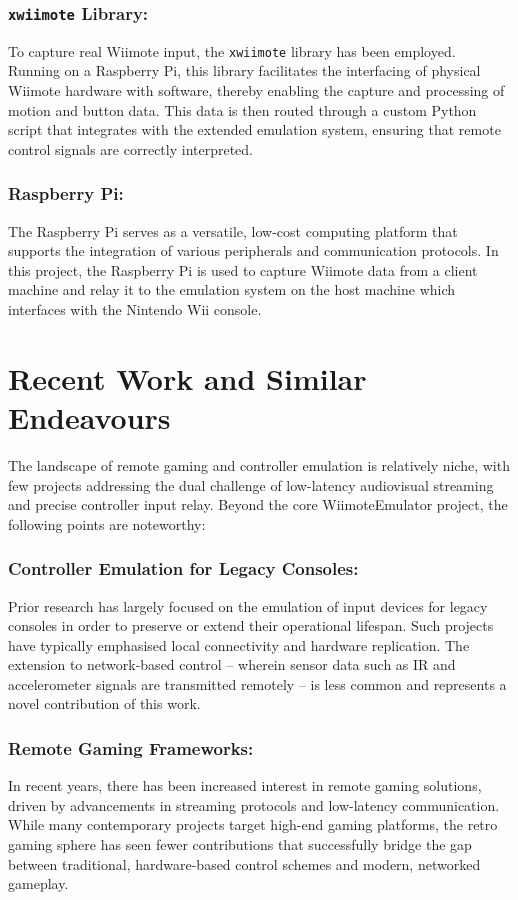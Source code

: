 \subsubsection{\texttt{xwiimote} Library\cite{xwiimote}:} To capture real Wiimote input, the \texttt{xwiimote} library has been employed. Running on a Raspberry Pi, this library facilitates the interfacing of physical Wiimote hardware with software, thereby enabling the capture and processing of motion and button data. This data is then routed through a custom Python script that integrates with the extended emulation system, ensuring that remote control signals are correctly interpreted.

\subsubsection{Raspberry Pi:} The Raspberry Pi serves as a versatile, low-cost computing platform that supports the integration of various peripherals and communication protocols. In this project, the Raspberry Pi is used to capture Wiimote data from a client machine and relay it to the emulation system on the host machine which interfaces with the Nintendo Wii console.


\section{Recent Work and Similar Endeavours}

The landscape of remote gaming and controller emulation is relatively niche, with few projects addressing the dual challenge of low-latency audiovisual streaming and precise controller input relay. Beyond the core WiimoteEmulator project, the following points are noteworthy:

\subsubsection{Controller Emulation for Legacy Consoles:} Prior research has largely focused on the emulation of input devices for legacy consoles in order to preserve or extend their operational lifespan. Such projects have typically emphasised local connectivity and hardware replication. The extension to network-based control -- wherein sensor data such as IR and accelerometer signals are transmitted remotely -- is less common and represents a novel contribution of this work.

\subsubsection{Remote Gaming Frameworks:} In recent years, there has been increased interest in remote gaming solutions, driven by advancements in streaming protocols and low-latency communication. While many contemporary projects target high-end gaming platforms, the retro gaming sphere has seen fewer contributions that successfully bridge the gap between traditional, hardware-based control schemes and modern, networked gameplay.

